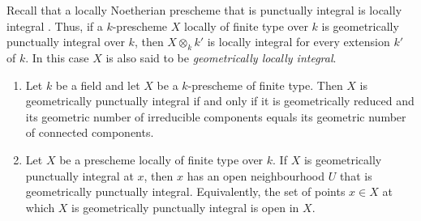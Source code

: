 Recall that a locally Noetherian prescheme that is punctually integral
is locally integral .
Thus, if a $k$-prescheme $X$ locally of finite type over $k$ is
geometrically punctually integral over $k$, then
$X\otimes_k k'$ is locally integral for every extension $k'$ of $k$.
In this case $X$ is also said to be
\emph{geometrically locally integral}.

\begin{proposition}[4.6.15]
\label{IV.4.6.15}
\begin{enumerate}
\item[\rm(i)]
\label{IV.4.6.15.i}
Let $k$ be a field and let $X$ be a $k$-prescheme of finite type.
Then $X$ is geometrically punctually integral if and only if it is
geometrically reduced and its geometric number of irreducible
components equals its geometric number of connected components.

\item[\rm(ii)]
\label{IV.4.6.15.ii}
Let $X$ be a prescheme locally of finite type over $k$.
If $X$ is geometrically punctually integral at $x$, then $x$ has an
open neighbourhood $U$ that is geometrically punctually integral.
Equivalently, the set of points $x\in X$ at which $X$ is geometrically
punctually integral is open in $X$.
\end{enumerate}
\end{proposition}

